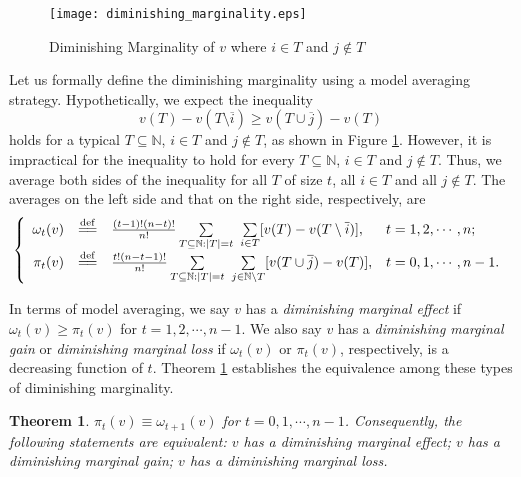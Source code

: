 \documentclass[a4paper,12pt]{article}
\newtheorem{theorem}{Theorem}
\newcommand{\eqdef}{\overset{\mathrm{def}}{=\joinrel=}}
\begin{document}
\begin{figure}[!t]
	\centering
	\texttt{[image: diminishing\_marginality.eps]}
	\caption{Diminishing Marginality of $v$ where $i\in T$ and $j\not \in T$}\label{fig:diminshing_marginal}
\end{figure}


Let us formally define the diminishing marginality using a model averaging strategy.
Hypothetically, we expect the inequality
$$
v(T) - v(T\setminus \overline{i}) \ge v(T\cup \overline{j}) - v(T)
$$
holds for a typical  $T\subseteq \mathbb{N}$,  $i\in T$ and  $j\not \in T$, as shown in Figure \ref{fig:diminshing_marginal}.
However, it is impractical for the inequality to hold for every $T \subseteq \mathbb{N}$, $i\in T$ and $j\not \in T$.
Thus, we average both sides of the inequality for all $T$ of size $t$, all $i\in T$ and all $j\not \in T$.
The averages on the left side and that on the right side, respectively, are
$$
\left \{
\begin{array}{rcll}
\omega_t(v) 
&\eqdef& 
\frac{ (t-1)! (n-t)!}{n!} \sum\limits_{T\subseteq \mathbb{N}: |T|=t} \
\sum\limits_{i\in T} [v(T) - v(T\setminus \overline{i}) ], &t=1,2,\cdots,n;\\

\pi_t (v) 
&\eqdef& 
\frac{ t! (n-t-1)!}{n!} \sum\limits_{T\subseteq \mathbb{N}: |T|=t} \
\sum\limits_{j\in \mathbb{N} \setminus T} [v(T\cup \overline{j}) - v(T) ], &t=0,1,\cdots,n-1.
\end{array}
\right .
$$

In terms of model averaging, we say $v$ has a \textit{diminishing marginal effect} if  $\omega_t(v) \ge \pi_t(v)$ for $t=1,2,\cdots,n-1$.
We also say $v$ has a \textit{diminishing marginal gain} or \textit{diminishing marginal loss} if 
$\omega_t (v)$ or $\pi_t (v)$, respectively, is a decreasing function of $t$.
Theorem \ref{thm:pi_omega} establishes the equivalence among these types  of 
diminishing marginality.

\begin{theorem}\label{thm:pi_omega}
$\pi_t(v) \equiv \omega_{t+1}(v)$ for $t=0,1,\cdots, n-1$.
Consequently, the following statements are equivalent:
$v$ has a diminishing marginal effect;
$v$ has a diminishing marginal gain;
$v$ has a diminishing marginal loss.
\end{theorem}
\end{document}
